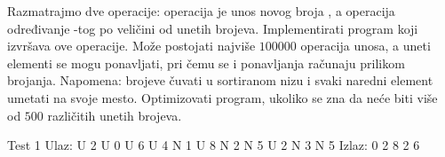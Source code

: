 \begin{Exercise}[label=514]
  Razmatrajmo dve operacije: operacija  je unos novog broja
  , a operacija  određivanje -tog po
  veličini od unetih brojeva. Implementirati program koji izvršava ove
  operacije. Može postojati najviše $100000$ operacija unosa, a uneti
  elementi se mogu ponavljati, pri čemu se i ponavljanja računaju
  prilikom brojanja. Napomena: brojeve čuvati u sortiranom nizu i
  svaki naredni element umetati na svoje mesto. Optimizovati program,
  ukoliko se zna da neće biti više od $500$ različitih unetih brojeva.
  
\begin{maxitest}
\begin{test}{Test 1}
Ulaz: U 2 U 0 U 6 U 4 N 1 U 8 N 2 N 5 U 2 N 3 N 5
Izlaz: 0 2 8 2 6
\end{test}
\end{maxitest}
  
\end{Exercise}

